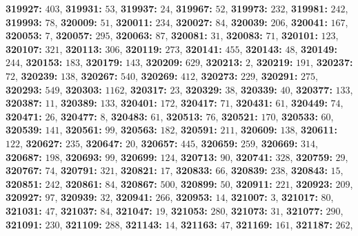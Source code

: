 \textsf{\bfseries 319927:} $403$, \textsf{\bfseries 319931:} $53$, \textsf{\bfseries 319937:} $24$, \textsf{\bfseries 319967:} $52$, \textsf{\bfseries 319973:} $232$, \textsf{\bfseries 319981:} $242$, \textsf{\bfseries 319993:} $78$, \textsf{\bfseries 320009:} $51$, \textsf{\bfseries 320011:} $234$, \textsf{\bfseries 320027:} $84$, \textsf{\bfseries 320039:} $206$, \textsf{\bfseries 320041:} $167$, \textsf{\bfseries 320053:} $7$, \textsf{\bfseries 320057:} $295$, \textsf{\bfseries 320063:} $87$, \textsf{\bfseries 320081:} $31$, \textsf{\bfseries 320083:} $71$, \textsf{\bfseries 320101:} $123$, \textsf{\bfseries 320107:} $321$, \textsf{\bfseries 320113:} $306$, \textsf{\bfseries 320119:} $273$, \textsf{\bfseries 320141:} $455$, \textsf{\bfseries 320143:} $48$, \textsf{\bfseries 320149:} $244$, \textsf{\bfseries 320153:} $183$, \textsf{\bfseries 320179:} $143$, \textsf{\bfseries 320209:} $629$, \textsf{\bfseries 320213:} $2$, \textsf{\bfseries 320219:} $191$, \textsf{\bfseries 320237:} $72$, \textsf{\bfseries 320239:} $138$, \textsf{\bfseries 320267:} $540$, \textsf{\bfseries 320269:} $412$, \textsf{\bfseries 320273:} $229$, \textsf{\bfseries 320291:} $275$, \textsf{\bfseries 320293:} $549$, \textsf{\bfseries 320303:} $1162$, \textsf{\bfseries 320317:} $23$, \textsf{\bfseries 320329:} $38$, \textsf{\bfseries 320339:} $40$, \textsf{\bfseries 320377:} $133$, \textsf{\bfseries 320387:} $11$, \textsf{\bfseries 320389:} $133$, \textsf{\bfseries 320401:} $172$, \textsf{\bfseries 320417:} $71$, \textsf{\bfseries 320431:} $61$, \textsf{\bfseries 320449:} $74$, \textsf{\bfseries 320471:} $26$, \textsf{\bfseries 320477:} $8$, \textsf{\bfseries 320483:} $61$, \textsf{\bfseries 320513:} $76$, \textsf{\bfseries 320521:} $170$, \textsf{\bfseries 320533:} $60$, \textsf{\bfseries 320539:} $141$, \textsf{\bfseries 320561:} $99$, \textsf{\bfseries 320563:} $182$, \textsf{\bfseries 320591:} $211$, \textsf{\bfseries 320609:} $138$, \textsf{\bfseries 320611:} $122$, \textsf{\bfseries 320627:} $235$, \textsf{\bfseries 320647:} $20$, \textsf{\bfseries 320657:} $445$, \textsf{\bfseries 320659:} $259$, \textsf{\bfseries 320669:} $314$, \textsf{\bfseries 320687:} $198$, \textsf{\bfseries 320693:} $99$, \textsf{\bfseries 320699:} $124$, \textsf{\bfseries 320713:} $90$, \textsf{\bfseries 320741:} $328$, \textsf{\bfseries 320759:} $29$, \textsf{\bfseries 320767:} $74$, \textsf{\bfseries 320791:} $321$, \textsf{\bfseries 320821:} $17$, \textsf{\bfseries 320833:} $66$, \textsf{\bfseries 320839:} $238$, \textsf{\bfseries 320843:} $15$, \textsf{\bfseries 320851:} $242$, \textsf{\bfseries 320861:} $84$, \textsf{\bfseries 320867:} $500$, \textsf{\bfseries 320899:} $50$, \textsf{\bfseries 320911:} $221$, \textsf{\bfseries 320923:} $209$, \textsf{\bfseries 320927:} $97$, \textsf{\bfseries 320939:} $32$, \textsf{\bfseries 320941:} $266$, \textsf{\bfseries 320953:} $14$, \textsf{\bfseries 321007:} $3$, \textsf{\bfseries 321017:} $80$, \textsf{\bfseries 321031:} $47$, \textsf{\bfseries 321037:} $84$, \textsf{\bfseries 321047:} $19$, \textsf{\bfseries 321053:} $280$, \textsf{\bfseries 321073:} $31$, \textsf{\bfseries 321077:} $290$, \textsf{\bfseries 321091:} $230$, \textsf{\bfseries 321109:} $288$, \textsf{\bfseries 321143:} $14$, \textsf{\bfseries 321163:} $47$, \textsf{\bfseries 321169:} $161$, \textsf{\bfseries 321187:} $262$, 
